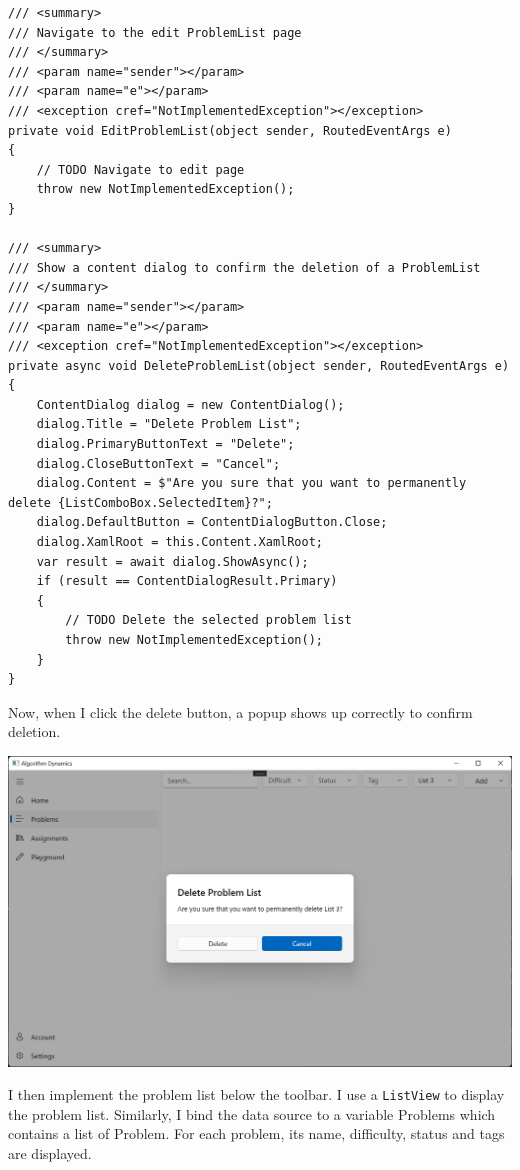 \documentclass[a4paper]{report}
\newcommand{\code}{\texttt}
\begin{document}
\begin{verbatim}
/// <summary>
/// Navigate to the edit ProblemList page
/// </summary>
/// <param name="sender"></param>
/// <param name="e"></param>
/// <exception cref="NotImplementedException"></exception>
private void EditProblemList(object sender, RoutedEventArgs e)
{
    // TODO Navigate to edit page
    throw new NotImplementedException();
}

/// <summary>
/// Show a content dialog to confirm the deletion of a ProblemList
/// </summary>
/// <param name="sender"></param>
/// <param name="e"></param>
/// <exception cref="NotImplementedException"></exception>
private async void DeleteProblemList(object sender, RoutedEventArgs e)
{
    ContentDialog dialog = new ContentDialog();
    dialog.Title = "Delete Problem List";
    dialog.PrimaryButtonText = "Delete";
    dialog.CloseButtonText = "Cancel";
    dialog.Content = $"Are you sure that you want to permanently delete {ListComboBox.SelectedItem}?";
    dialog.DefaultButton = ContentDialogButton.Close;
    dialog.XamlRoot = this.Content.XamlRoot;
    var result = await dialog.ShowAsync();
    if (result == ContentDialogResult.Primary)
    {
        // TODO Delete the selected problem list
        throw new NotImplementedException();
    }
}
\end{verbatim}

Now, when I click the delete button, a popup shows up correctly to confirm deletion.

\includegraphics[width=\textwidth, height=\textheight, keepaspectratio]{ProblemsPage-ContentDialog}

I then implement the problem list below the toolbar. I use a \code{ListView} to display the problem list. Similarly, I bind the data source to a variable Problems which contains a list of Problem. For each problem, its name, difficulty, status and tags are displayed.
\end{document}
